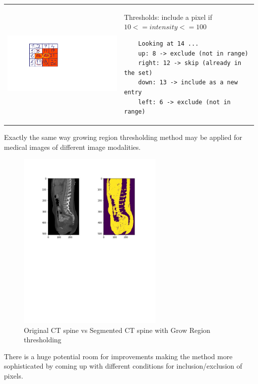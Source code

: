 \begin{tabular}{C{7cm}  L{7cm}}
    \includegraphics[width=12cm]{images/grow_region_3.png} & Thresholds: include a pixel if $10 <= intensity <= 100$ \newline 
    \begin{lstlisting}
    Looking at 14 ...
    up: 8 -> exclude (not in range)
    right: 12 -> skip (already in the set)
    down: 13 -> include as a new entry
    left: 6 -> exclude (not in range)
    \end{lstlisting}
\end{tabular}

Exactly the same way growing region thresholding method may be applied for medical images of different image modalities.
\begin{figure}[h]
    \centering \includegraphics[width=7cm]{images/ct-spine-grow-region-segmented.jpg}
    \vspace*{-30mm} \caption {Original CT spine vs Segmented CT spine with Grow Region thresholding}
\end{figure}    

There is a huge potential room for improvements making the method more sophisticated by coming up with different conditions for inclusion/exclusion of pixels.


